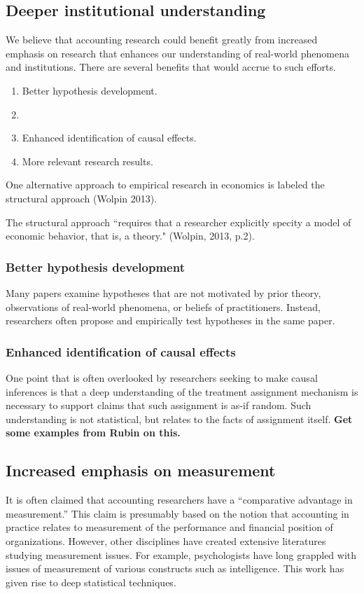 
\subsection{Deeper institutional understanding}

We believe that accounting research could benefit greatly from increased emphasis on research that enhances our understanding of real-world phenomena and institutions. There are several benefits that would accrue to such efforts.

\begin{enumerate}
\item Better hypothesis development.  
\item %
\item Enhanced identification of causal effects.
\item More relevant research results.
\end{enumerate}

One alternative approach to empirical research in economics is labeled the structural approach (Wolpin 2013).

The structural approach ``requires that a researcher explicitly specity a model of economic behavior, that is, a theory." (Wolpin, 2013, p.2).


\subsubsection{Better hypothesis development}
Many papers examine hypotheses that are not motivated by prior theory,  observations of real-world phenomena, or beliefs of practitioners. Instead, researchers often propose and empirically test hypotheses in the same paper.

\subsubsection{Enhanced identification of causal effects}
One point that is often overlooked by researchers seeking to make causal inferences is that a deep understanding of the treatment assignment mechanism is necessary to support claims that such assignment is as-if random. Such understanding is not statistical, but relates to the facts of assignment itself. \textbf{Get some examples from Rubin on this.}

\subsection{Increased emphasis on measurement}
It is often claimed that accounting researchers have a ``comparative advantage in measurement.'' This claim is presumably based on the notion that accounting in practice relates to measurement of the performance and financial position of organizations. However, other disciplines have created extensive literatures studying measurement issues. For example, psychologists have long grappled with issues of measurement of various constructs such as intelligence. This work has given rise to deep statistical techniques.

